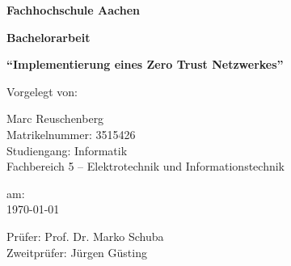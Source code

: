 \thispagestyle{empty} %

\vspace*{2cm}

\begin{center}
	\textbf{\Large Fachhochschule Aachen} \\
	\vspace{1.5cm}
	
	\textbf{\huge Bachelorarbeit} \\
	\vspace{1cm}
	
	\textbf{\Large “Implementierung eines Zero Trust Netzwerkes”} \\
	\vspace{2cm}
	
	Vorgelegt von:
\end{center}

\vspace{0.5cm}
\begin{flushleft}
	Marc Reuschenberg \\
	Matrikelnummer: 3515426 \\
	Studiengang: Informatik \\
	Fachbereich 5 – Elektrotechnik und Informationstechnik \\
\end{flushleft}

\vspace{0.5cm}
\begin{flushleft} 
	am: \\
	\today
\end{flushleft}

\vspace{0.5cm}
\begin{flushleft}
	Prüfer: Prof. Dr. Marko Schuba \\
	Zweitprüfer: Jürgen Güsting
\end{flushleft}


\newpage

